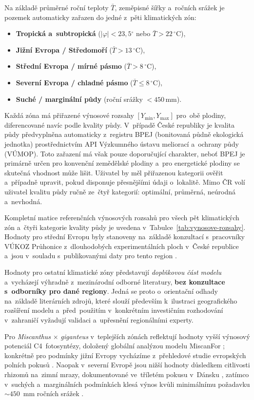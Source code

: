 Na základě průměrné roční teploty $\bar{T}$, zeměpisné šířky a~ročních srážek je pozemek automaticky zařazen do jedné z~pěti klimatických zón:
\begin{itemize}
  \item \textbf{Tropická a~subtropická} ($|\varphi| < 23{,}5{}^{\circ}$ nebo $\bar{T} > 22\,{}^{\circ}$C),
  \item \textbf{Jižní Evropa / Středomoří} ($\bar{T} > 13\,{}^{\circ}$C),
  \item \textbf{Střední Evropa / mírné pásmo} ($\bar{T} > 8\,{}^{\circ}$C),
  \item \textbf{Severní Evropa / chladné pásmo} ($\bar{T} \leq 8\,{}^{\circ}$C),
  \item \textbf{Suché / marginální půdy} (roční srážky $< 450$\,mm).
\end{itemize}
Každá zóna má přiřazené výnosové rozsahy $[Y_{\min}, Y_{\max}]$ 
pro~obě plodiny, diferencované navíc podle kvality půdy. V~případě 
České republiky je kvalita půdy předvyplněna automaticky z~registru 
BPEJ (bonitovaná půdně ekologická jednotka) prostřednictvím API 
Výzkumného ústavu meliorací a~ochrany půdy (VÚMOP). Toto zařazení 
má však pouze doporučující charakter, neboť BPEJ je primárně určen 
pro konvenční zemědělské plodiny a~pro energetické plodiny se 
skutečná vhodnost může lišit. Uživatel by měl přiřazenou kategorii 
ověřit a~případně upravit, pokud disponuje přesnějšími údaji 
o~lokalitě. Mimo ČR volí uživatel kvalitu půdy ručně ze~čtyř 
kategorií: optimální, průměrná, neúrodná a~nevhodná.

Kompletní matice referenčních výnosových rozsahů pro všech pět 
klimatických zón a~čtyři kategorie kvality půdy je uvedena 
v~Tabulce~\ref{tab:vynosove-rozsahy}. Hodnoty pro střední Evropu 
byly stanoveny na~základě konzultací s~pracovníky VÚKOZ Průhonice 
z~dlouhodobých experimentálních ploch v~České republice 
a~jsou v~souladu s~publikovanými daty pro tento region 
\citep{mccalmont_2017,knapek_2024,stolarski_2019}. 

Hodnoty pro ostatní klimatické zóny představují \emph{doplňkovou 
část modelu} a~vycházejí výhradně z~mezinárodní odborné literatury, 
\textbf{bez konzultace s~odborníky pro dané regiony}. Jedná se 
proto o~orientační odhady na~základě literárních zdrojů, které 
slouží především k~ilustraci geografického rozšíření modelu 
a~před~použitím v~konkrétním investičním rozhodování v~zahraničí 
vyžadují validaci a~upřesnění regionálními experty.

Pro \textit{Miscanthus} $\times$ \textit{giganteus} v~teplejších 
zónách reflektují hodnoty vyšší výnosový potenciál C4~fotosyntézy, 
doložený globální analýzou modelu MiscanFor 
\citep{abdalla_2024}; konkrétně pro podmínky jižní Evropy 
vycházíme z~přehledové studie evropských polních pokusů 
\citep{LEWANDOWSKI2000}. Naopak v~severní Evropě jsou nižší 
hodnoty důsledkem citlivosti rhizomů na~zimní mrazy, dokumentované 
ve~tříletém pokusu v~Dánsku \citep{Jørgensen2003}, zatímco 
v~suchých a~marginálních podmínkách klesá výnos kvůli minimálnímu 
požadavku $\sim 450$~mm ročních srážek \citep{Ouattara2021}.

